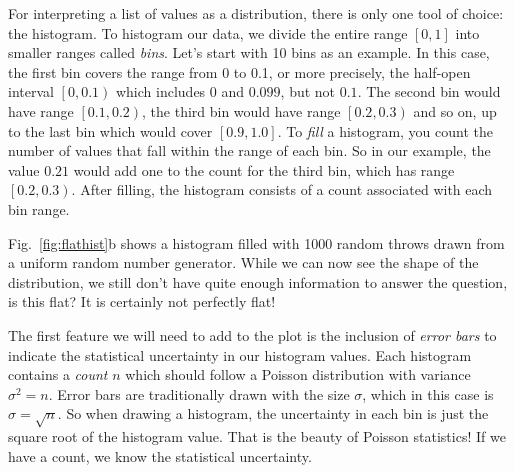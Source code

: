 For interpreting a list of values as a distribution, there is only one
tool of choice: the histogram.  To histogram our data, we divide the
entire range $[0,1]$ into smaller ranges called {\em bins}.  Let's
start with 10 bins as an example. In this case, the first bin covers
the range from 0 to 0.1, or more precisely, the half-open interval
$\left[0,0.1\right)$ which includes $0$ and $0.099$, but not $0.1$.
  The second bin would have range $\left[0.1,0.2\right)$, the third
    bin would have range $\left[0.2,0.3\right)$ and so on, up to the
      last bin which would cover $\left[0.9,1.0\right]$.  To {\em
        fill} a histogram, you count the number of values that fall
      within the range of each bin.  So in our example, the value
      $0.21$ would add one to the count for the third bin, which has
      range $\left[0.2,0.3\right)$.  After filling, the histogram
        consists of a count associated with each bin range.

Fig.~\ref{fig:flathist}b shows a histogram filled with 1000 random
throws drawn from a uniform random number generator.  While we can now
see the shape of the distribution, we still don't have quite enough
information to answer the question, is this flat?  It is certainly not
perfectly flat!

The first feature we will need to add to the plot is the inclusion of
{\em error bars} to indicate the statistical uncertainty in our
histogram values.  Each histogram contains a {\em count} $n$ which
should follow a Poisson distribution with variance $\sigma^2 = n$.
Error bars are traditionally drawn with the size $\sigma$, which in
this case is $\sigma = \sqrt{n}$.  So when drawing a histogram, the
uncertainty in each bin is just the square root of the histogram
value.  That is the beauty of Poisson statistics!  If we have a count,
we know the statistical uncertainty.

